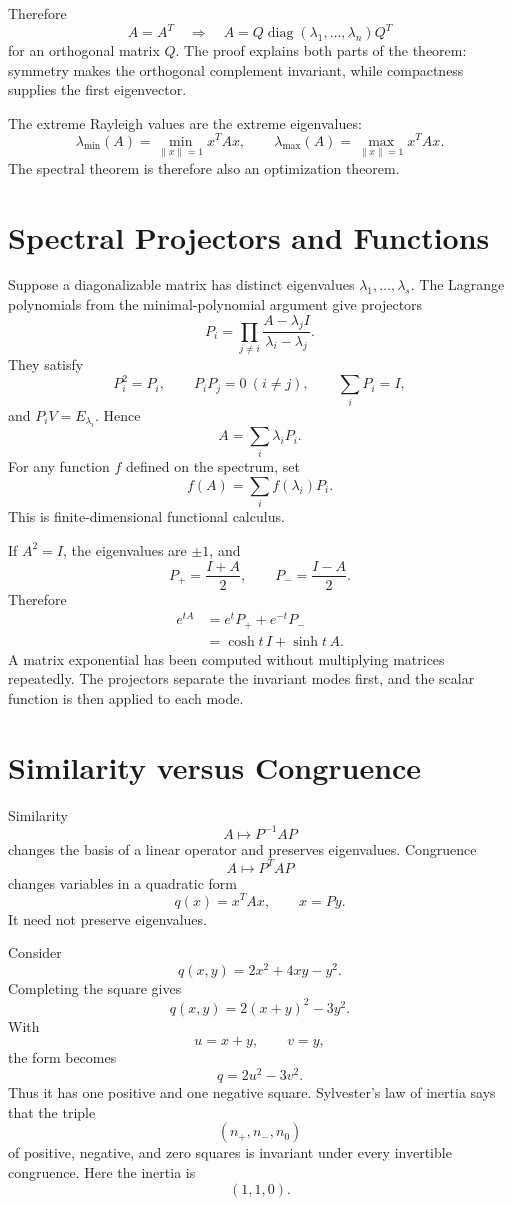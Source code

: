 Therefore
\[
  \boxed{
  A=A^T
  \quad\Longrightarrow\quad
  A=Q\operatorname{diag}(\lambda_1,\ldots,\lambda_n)Q^T}
\]
for an orthogonal matrix \(Q\).  The proof explains both parts of the theorem: symmetry makes the orthogonal complement invariant, while compactness supplies the first eigenvector.

The extreme Rayleigh values are the extreme eigenvalues:
\[
  \lambda_{\min}(A)
  =\min_{\|x\|=1}x^TAx,
  \qquad
  \lambda_{\max}(A)
  =\max_{\|x\|=1}x^TAx.
\]
The spectral theorem is therefore also an optimization theorem.

\section{Spectral Projectors and Functions}

Suppose a diagonalizable matrix has distinct eigenvalues \(\lambda_1,\ldots,\lambda_s\).  The Lagrange polynomials from the minimal-polynomial argument give projectors
\[
  P_i=
  \prod_{j\ne i}
  \frac{A-\lambda_jI}{\lambda_i-\lambda_j}.
\]
They satisfy
\[
  P_i^2=P_i,
  \qquad
  P_iP_j=0\ (i\ne j),
  \qquad
  \sum_iP_i=I,
\]
and \(P_iV=E_{\lambda_i}\).  Hence
\[
  A=\sum_i\lambda_iP_i.
\]
For any function \(f\) defined on the spectrum, set
\[
  f(A)=\sum_i f(\lambda_i)P_i.
\]
This is finite-dimensional functional calculus.

If \(A^2=I\), the eigenvalues are \(\pm1\), and
\[
  P_+=\frac{I+A}{2},
  \qquad
  P_-=\frac{I-A}{2}.
\]
Therefore
\[
\begin{aligned}
  e^{tA}
  &=e^tP_++e^{-t}P_-\\
  &=\cosh t\,I+\sinh t\,A.
\end{aligned}
\]
A matrix exponential has been computed without multiplying matrices repeatedly.  The projectors separate the invariant modes first, and the scalar function is then applied to each mode.

\section{Similarity versus Congruence}

Similarity
\[
  A\longmapsto P^{-1}AP
\]
changes the basis of a linear operator and preserves eigenvalues.  Congruence
\[
  A\longmapsto P^TAP
\]
changes variables in a quadratic form
\[
  q(x)=x^TAx,
  \qquad x=Py.
\]
It need not preserve eigenvalues.

Consider
\[
  q(x,y)=2x^2+4xy-y^2.
\]
Completing the square gives
\[
  q(x,y)=2(x+y)^2-3y^2.
\]
With
\[
  u=x+y,
  \qquad v=y,
\]
the form becomes
\[
  q=2u^2-3v^2.
\]
Thus it has one positive and one negative square.  Sylvester's law of inertia says that the triple
\[
  (n_+,n_-,n_0)
\]
of positive, negative, and zero squares is invariant under every invertible congruence.  Here the inertia is
\[
  (1,1,0).
\]

